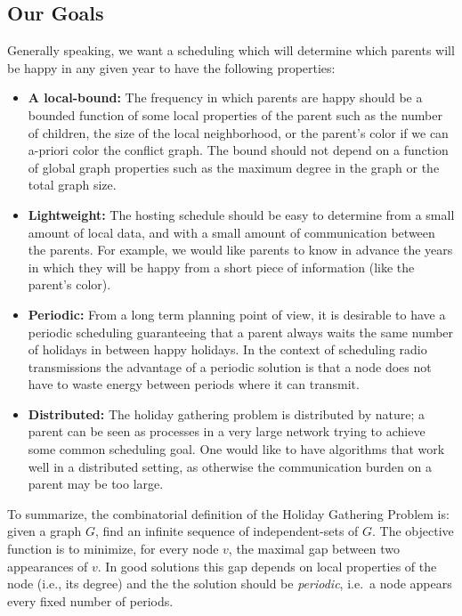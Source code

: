 \documentclass[11pt]{article}
\begin{document}
\subsection{Our Goals}
Generally speaking, we want a scheduling which will determine which
parents will be happy in any given year to have the following
properties:
\begin{itemize}
 \item {\bf A local-bound:} The frequency in which parents are happy
   should be a bounded function of some local properties of the
   parent such as the number of children, the size of the local
   neighborhood, or the parent's color if we can a-priori color the
   conflict graph. The bound should not depend on a function of global
   graph properties such as the maximum degree in the graph or the
   total graph size.

\item {\bf Lightweight:} The hosting schedule should be easy to
  determine from a small amount of local data, and with a small amount
  of communication between the parents. For example, we would like
  parents to know in advance the years in which they will be happy
  from a short piece of information (like the parent's color).

\item {\bf Periodic:} From a long term planning point of view, it is desirable to have a periodic scheduling guaranteeing that a parent always waits the same number of holidays in between happy holidays.
In the context of scheduling radio transmissions the advantage of a periodic solution is that a node does not have to waste energy between periods where it can transmit.

\item {\bf Distributed:} The holiday gathering problem is distributed by nature; a parent can be seen as processes in a very large network trying to achieve some common scheduling goal. One would like to have algorithms that work well in a distributed setting, as otherwise the communication burden on a parent may be too large.

\end{itemize}

To summarize, the combinatorial definition of the Holiday Gathering Problem is: given a graph $G$, find an infinite sequence of independent-sets of $G$. The objective function is to minimize, for every node $v$, the maximal gap between two appearances of $v$.
In good solutions this gap depends on local properties of the node (i.e., its degree) and the the solution should be {\em periodic}, i.e.\ a node appears every fixed number of periods.
\end{document}
